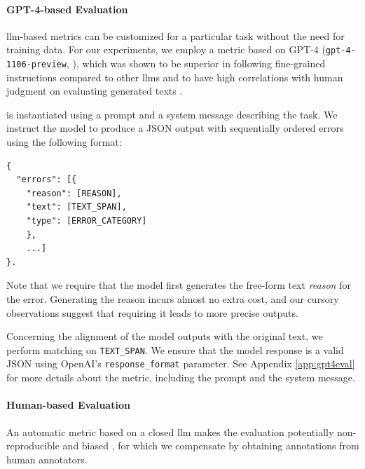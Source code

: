 \paragraph{GPT-4-based Evaluation}
\label{sec:gpt4eval}

\ac{llm}-based metrics can be customized for a particular task without the need for training data. For our experiments, we employ a metric based on GPT-4 (\texttt{gpt-4-1106-preview}, \citealp{openai2023gpt4}), which was shown to be superior in following fine-grained instructions compared to other \acp{llm} and to have high correlations with human judgment on evaluating generated texts  \cite{zhaoInvestigatingTabletoTextGeneration2023,sottanaEvaluationMetricsEra2023,kocmiGEMBAMQMDetectingTranslation2023,kocmiLargeLanguageModels2023}.

\gptmetric{} is instantiated using a prompt and a system message describing the task. We instruct the model to produce a JSON output with sequentially ordered errors using the following format:

\small
\begin{verbatim}
{
  "errors": [{
    "reason": [REASON],
    "text": [TEXT_SPAN],
    "type": [ERROR_CATEGORY]
    }, 
    ...]
}.
\end{verbatim}
\normalsize


Note that we require that the model first generates the free-form text \textit{reason} for the error. Generating the reason incurs almost no extra cost, and our cursory observations suggest that requiring it leads to more precise outputs.

Concerning the alignment of the model outputs with the original text, we perform matching on \texttt{TEXT\_SPAN}. We ensure that the model response is a valid JSON using OpenAI's \texttt{response\_format} parameter.  See Appendix \ref{app:gpt4eval} for more details about the metric, including the prompt and the system message.


\paragraph{Human-based Evaluation}
\label{sec:humaneval}

An automatic metric based on a closed \ac{llm} makes the evaluation potentially non-reproducible and biased \cite{kocmiGEMBAMQMDetectingTranslation2023,wangLargeLanguageModels2023}, for which we compensate by obtaining annotations from human annotators.

